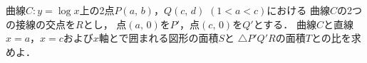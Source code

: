 \documentclass[../../main.tex]{subfiles}
\begin{document}
曲線$C:y=\log x$上の2点$P(a, \, b)$，$Q(c, \, d)$ $(1<a<c)$における
曲線$C$の2つの接線の交点を$R$とし，
点$(a, \, 0)$を$P'$，点$(c, \, 0)$を$Q'$とする．
曲線$C$と直線$x=a$，$x=c$および$x$軸とで囲まれる図形の面積$S$と
$\triangle P' Q' R$の面積$T$との比を求めよ．
\end{document}
